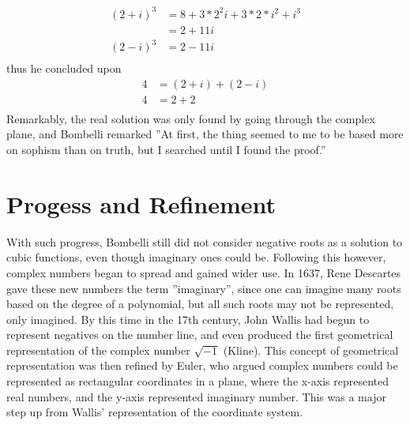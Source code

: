 \documentclass[12pt]{article}
\begin{document}
\begin{align*}
    (2+i)^3&=8+3*2^2i+3*2*i^2+i^3\\
    &=2+11i\\
    (2-i)^3&=2-11i\\
\end{align*}
thus he concluded upon 
\begin{align*}
    4&=(2+i)+(2-i)\\
    4&=2+2\\
\end{align*}
Remarkably, the real solution was only found by going through the complex plane, and Bombelli remarked ''At first, the thing seemed to me to be based more on sophism than on truth, but I searched until I found the proof.''

\section{Progess and Refinement}
\hspace{\parindent}With such progress, Bombelli still did not consider negative roots as a solution to cubic functions, even though imaginary ones could be. Following this however, complex numbers began to spread and gained wider use.  In 1637, Rene Descartes gave these new numbers the term ''imaginary'', since one can imagine many roots based on the degree of a polynomial, but all such roots may not be represented, only imagined. By this time in the 17th century, John Wallis had begun to represent negatives on the number line, and even produced the first geometrical representation of the complex number $\sqrt{-1}$ (Kline). This concept of geometrical representation was then refined by Euler, who argued complex numbers could be represented as rectangular coordinates in a plane, where the x-axis represented real numbers, and the y-axis represented imaginary number. This was a major step up from Wallis' representation of the coordinate system. 
\end{document}
